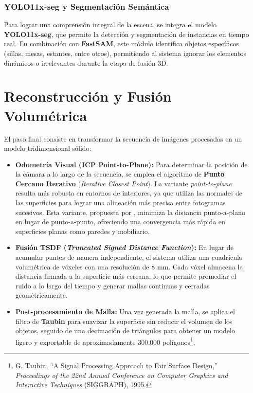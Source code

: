 \documentclass[12pt, a4, twoside, openany]{report}
\begin{document}
\subsubsection{YOLO11x-seg y Segmentación Semántica}

Para lograr una comprensión integral de la escena, se integra el modelo \textbf{YOLO11x-seg}, que permite la detección y segmentación de instancias en tiempo real. En combinación con \textbf{FastSAM}, este módulo identifica objetos específicos (sillas, mesas, estantes, entre otros), permitiendo al sistema ignorar los elementos dinámicos o irrelevantes durante la etapa de fusión 3D.


\section{Reconstrucción y Fusión Volumétrica}

El paso final consiste en transformar la secuencia de imágenes procesadas en un modelo tridimensional sólido:

\begin{itemize}
    \item \textbf{Odometría Visual (ICP Point-to-Plane):} Para determinar la posición de la cámara a lo largo de la secuencia, se emplea el algoritmo de \textbf{Punto Cercano Iterativo} (\textit{Iterative Closest Point}). La variante \textit{point-to-plane} resulta más robusta en entornos de interiores, ya que utiliza las normales de las superficies para lograr una alineación más precisa entre fotogramas sucesivos. Esta variante, propuesta por \cite{rusinkiewicz2001efficient}, minimiza la distancia punto-a-plano en lugar de punto-a-punto, ofreciendo una convergencia más rápida en superficies planas como paredes y mobiliario.
    \item \textbf{Fusión TSDF (\textit{Truncated Signed Distance Function}):} En lugar de acumular puntos de manera independiente, el sistema utiliza una cuadrícula volumétrica de vóxeles con una resolución de 8 mm. Cada vóxel almacena la distancia firmada a la superficie más cercana, lo que permite promediar el ruido a lo largo del tiempo y generar mallas continuas y cerradas geométricamente.
    \item \textbf{Post-procesamiento de Malla:} Una vez generada la malla, se aplica el filtro de \textbf{Taubin} para suavizar la superficie sin reducir el volumen de los objetos, seguido de una decimación de triángulos para obtener un modelo ligero y exportable de aproximadamente 300{,}000 polígonos\footnote{G. Taubin, ``A Signal Processing Approach to Fair Surface Design,'' \textit{Proceedings of the 22nd Annual Conference on Computer Graphics and Interactive Techniques} (SIGGRAPH), 1995.}.
\end{itemize}
\end{document}
